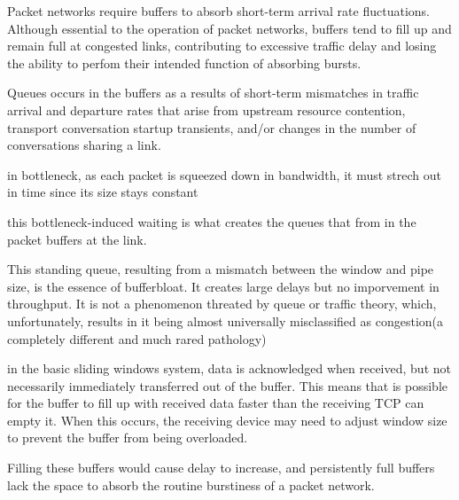 Packet networks require buffers to absorb short-term arrival rate fluctuations. Although essential to the operation of packet networks, buffers tend to fill up and remain full at congested links, contributing to excessive traffic delay and losing the ability to perfom their intended function of absorbing bursts.

Queues occurs in the buffers as a results of short-term mismatches in traffic arrival and departure rates that arise from upstream resource contention, transport conversation startup transients, and/or changes in the number of conversations sharing a link.

in bottleneck, as each packet is squeezed down in bandwidth, it must strech out in time since its size stays constant

this bottleneck-induced waiting is what creates the queues that from in the packet buffers at the link.

This standing queue, resulting from a mismatch between the window and pipe size, is the essence of bufferbloat. It creates large delays but no imporvement in throughput. It is not a phenomenon threated by queue or traffic theory, which, unfortunately, results in it being almost universally misclassified as congestion(a completely different and much rared pathology)

in the basic sliding windows system, data is acknowledged when received, but not necessarily immediately transferred out of the buffer. This means that is possible for the buffer to fill up with received data faster than the receiving TCP can empty it. When this occurs, the receiving device may need to adjust window size to prevent the buffer from being overloaded.


Filling these buffers would  cause delay to increase, and persistently full buffers lack the space to absorb the routine burstiness of a packet network.
